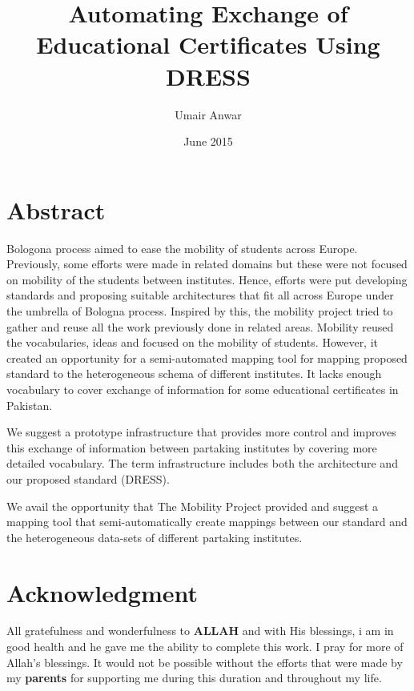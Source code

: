 \documentclass[12pt,a4paper,oneside]{book}
\title{Automating Exchange of Educational Certificates Using DRESS}
\author{Umair Anwar}
\date{June 2015}
\begin{document}
\maketitle


\chapter*{Abstract}

 Bologona process aimed to ease the mobility of students across Europe. Previously, some efforts were made in related domains but these were not focused on mobility of the students between institutes. Hence, efforts were put developing standards and proposing suitable architectures that fit all across Europe under the umbrella of Bologna process. Inspired by this, the mobility project tried to gather and reuse all the work previously done in related areas. Mobility reused the vocabularies, ideas and focused on the mobility of students. However, it created an opportunity for a semi-automated mapping tool for mapping proposed standard to the heterogeneous schema of different institutes. It lacks enough vocabulary to cover exchange of information for some educational certificates in Pakistan.
 
 We suggest a prototype infrastructure that provides more control and improves this exchange of information between partaking institutes by covering more detailed vocabulary. The term infrastructure includes both the architecture and our proposed standard (DRESS). 
 
 We avail the opportunity that The Mobility Project provided and suggest a mapping tool that semi-automatically create mappings between our standard and the heterogeneous data-sets of different partaking institutes. 

\certificateoforiginality
\chapter*{Acknowledgment}
All gratefulness and wonderfulness to {\bfseries ALLAH} and with His blessings, i am in good health and he gave me the ability to complete this work. I pray for more of Allah's blessings. It would not be possible without the efforts that were made by my {\bfseries parents} for supporting me during this duration and throughout my life. 
\end{document}
